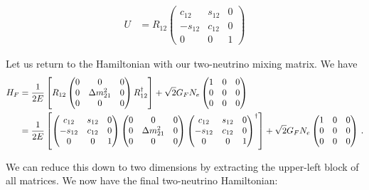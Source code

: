 \begin{align}
    U &= R_{12}
\begin{pmatrix}c_{12} & s_{12} & 0 \\ -s_{12} & c_{12} & 0 \\ 0 & 0 & 1 \end{pmatrix} 
\end{align}

Let us return to the Hamiltonian with our two-neutrino mixing matrix. We have 
\begin{align}
    H_F
        &= \frac{1}{2E}\left[R_{12} \begin{pmatrix}
            0 & 0 & 0 \\
            0 & \dm_{21} & 0 \\
            0 & 0 & 0
        \end{pmatrix} R_{12}^\dagger\right] + \sqrt{2}G_F N_e \begin{pmatrix}
            1 & 0 & 0 \\
            0 & 0 & 0 \\
            0 & 0 & 0
        \end{pmatrix} \nonumber \\
        &= \frac{1}{2E}\left[\begin{pmatrix}c_{12} & s_{12} & 0 \\ -s_{12} & c_{12} & 0 \\ 0 & 0 & 1 \end{pmatrix}  \begin{pmatrix}
            0 & 0 & 0 \\
            0 & \dm_{21} & 0 \\
            0 & 0 & 0
        \end{pmatrix} \begin{pmatrix}c_{12} & s_{12} & 0 \\ -s_{12} & c_{12} & 0 \\ 0 & 0 & 1 \end{pmatrix}^\dagger \right] + \sqrt{2}G_F N_e \begin{pmatrix}
            1 & 0 & 0 \\
            0 & 0 & 0 \\
            0 & 0 & 0
        \end{pmatrix}\,. 
\end{align}

We can reduce this down to two dimensions by extracting the upper-left block of all matrices. We now have the final two-neutrino Hamiltonian:

